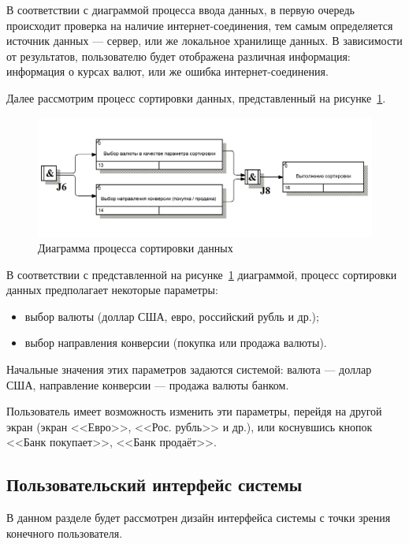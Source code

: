 В соответствии с диаграммой процесса ввода данных, в первую очередь
происходит проверка на наличие интернет-соединения, тем самым
определяется источник данных --- сервер, или же локальное
хранилище данных.
В зависимости от результатов, пользователю
будет отображена различная информация: информация о курсах валют,
или же ошибка интернет-соединения.


Далее рассмотрим процесс сортировки данных,
представленный на рисунке~\ref{fig:idef3_sort}.

\begin{figure}[h!]
  \centering
  \includegraphics[width=150mm]{pic/IDEF3_sort}
  \caption{Диаграмма процесса сортировки данных}
  \label{fig:idef3_sort}
\end{figure}

\pagebreak

В соответствии с представленной на рисунке~\ref{fig:idef3_sort} диаграммой,
процесс сортировки данных предполагает некоторые параметры:
\begin{itemize}
  \item выбор валюты (доллар США, евро, российский рубль и др.);
  \item выбор направления конверсии (покупка или продажа валюты).
\end{itemize}

Начальные значения этих параметров задаются системой: валюта --- доллар США,
направление конверсии --- продажа валюты банком.

Пользователь имеет возможность изменить эти параметры,
перейдя на другой экран (экран <<Евро>>, <<Рос. рубль>> и др.),
или коснувшись кнопок <<Банк покупает>>, <<Банк продаёт>>.


\subsection{Пользовательский интерфейс системы}

В данном разделе будет рассмотрен дизайн интерфейса системы с точки зрения
конечного пользователя.

